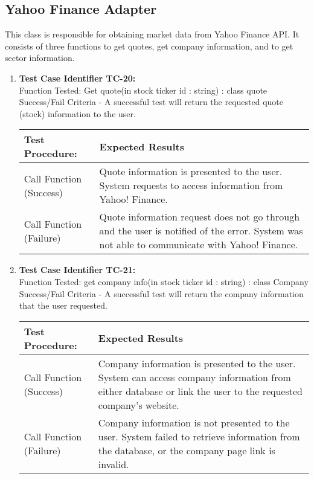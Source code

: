 \subsection{Yahoo Finance Adapter}

This class is responsible for obtaining market data from Yahoo Finance API. It
consists of three functions to get quotes, get company information, and to get
sector information.\\

\begin{enumerate}
  \item
    \textbf{Test Case Identifier TC-20:}\\

    Function Tested: Get quote(in stock ticker id : string) : class quote \\

    Success/Fail Criteria - A successful test will return the requested quote
    (stock) information to the user. \\

    \begin{longtable}{|p{2in}|p{4.5in}|}
    \hline
    {\large \color{color1}Test Procedure:}&{\large \color{color1}Expected Results}\\ \hline
    Call Function (Success) & Quote information is presented to the user. System
    requests to access information from Yahoo! Finance.
    \\ \hline
    Call Function (Failure) & Quote information request does not go through and
    the user is notified of the error. System was not able to communicate with
    Yahoo! Finance. \\ \hline
    \end{longtable}
    \vspace{5mm}

  \item
    \textbf{Test Case Identifier TC-21:}\\

    Function Tested: get company info(in stock ticker id : string) : class
    Company \\

    Success/Fail Criteria - A successful test will return the company
    information that the user requested. \\

    \begin{longtable}{|p{2in}|p{4.5in}|}
    \hline
    {\large \color{color1}Test Procedure:}&{\large \color{color1}Expected Results}\\ \hline
    Call Function (Success) & Company information is presented to the user.
    System can access company information from either database or link the user
    to the requested company’s website.
    \\ \hline
    Call Function (Failure) & Company information is not presented to the user.
    System failed to retrieve information from the database, or the company
    page link is invalid. \\ \hline
    \end{longtable}
    \vspace{5mm}

\end{enumerate}


